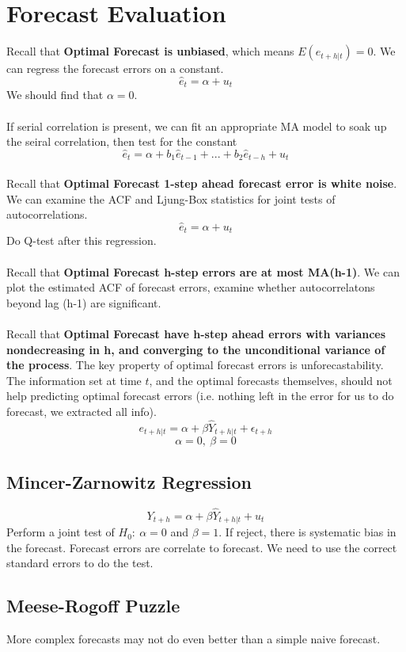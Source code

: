 \documentclass{article}
\begin{document}
\section{Forecast Evaluation}
Recall that \textbf{Optimal Forecast is unbiased}, which means $E(e_{t+h|t}) = 0$. We can regress the forecast errors on a constant.
$$\hat{e}_t = \alpha + u_t$$
We should find that $\alpha = 0$.\\
\\
If serial correlation is present, we can fit an appropriate MA model to soak up the seiral correlation, then test for the constant
$$\hat{e}_t = \alpha + b_1\hat{e}_{t-1} + ... + b_2\hat{e}_{t-h} + u_t$$
\\
Recall that \textbf{Optimal Forecast 1-step ahead forecast error is white noise}. We can examine the ACF and Ljung-Box statistics for joint tests of autocorrelations.
$$\hat{e}_t = \alpha + u_t$$
Do Q-test after this regression.\\
\\
Recall that \textbf{Optimal Forecast h-step errors are at most MA(h-1)}. We can plot the estimated ACF of forecast errors, examine whether autocorrelatons beyond lag (h-1) are significant.\\
\\
Recall that \textbf{Optimal Forecast have h-step ahead errors with variances nondecreasing in h, and converging to the unconditional variance of the process}. The key property of optimal forecast errors is unforecastability. The information set at time $t$, and the optimal forecasts themselves, should not help predicting optimal forecast errors (i.e. nothing left in the error for us to do forecast, we extracted all info).
$$e_{t+h|t} = \alpha + \beta \hat{Y}_{t+h|t} + \epsilon_{t+h}$$
$$\alpha = 0, \ \beta = 0$$

\subsection{Mincer-Zarnowitz Regression}
$$Y_{t+h} = \alpha + \beta \hat{Y}_{t+h|t} + u_t$$
Perform a joint test of $H_0:\ \alpha = 0$ and $\beta = 1$. If reject, there is systematic bias in the forecast. Forecast errors are correlate to forecast. We need to use the correct standard errors to do the test.

\subsection{Meese-Rogoff Puzzle}
More complex forecasts may not do even better than a simple naive forecast.
\end{document}
